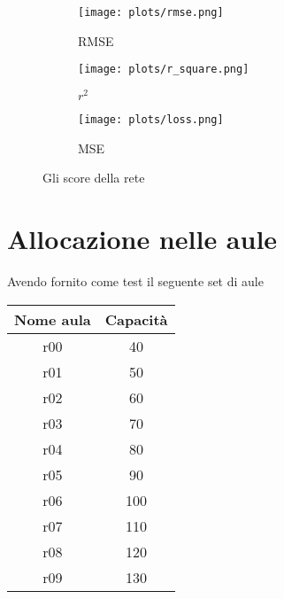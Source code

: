 \begin{figure}[h]
    \centering
    
    \begin{subfigure}[b]{0.45\linewidth}
        \texttt{[image: plots/rmse.png]}
        \caption{RMSE}
    \end{subfigure}
    \begin{subfigure}[b]{0.45\linewidth}
        \texttt{[image: plots/r\_square.png]}
        \caption{$r^2$}
    \end{subfigure}
    \begin{subfigure}[b]{0.9\linewidth}
        \texttt{[image: plots/loss.png]}
        \caption{MSE}
    \end{subfigure}
    \caption{Gli score della rete}
    \label{fig:example_opencv}
\end{figure}

\newpage

\section{Allocazione nelle aule}
\label{section:results_mp}

Avendo fornito come test il seguente set di aule

\begin{table}[h]
    \begin{small}
        \begin{center}
            \begin{tabular}[c]{c|c}
                Nome aula & Capacità \\
                \hline
                r00 & 40 \\
                r01 & 50 \\
                r02 & 60 \\
                r03 & 70 \\
                r04 & 80 \\
                r05 & 90 \\
                r06 & 100 \\
                r07 & 110 \\
                r08 & 120 \\
                r09 & 130 
            \end{tabular}
        \end{center}
    \end{small}
\end{table}

